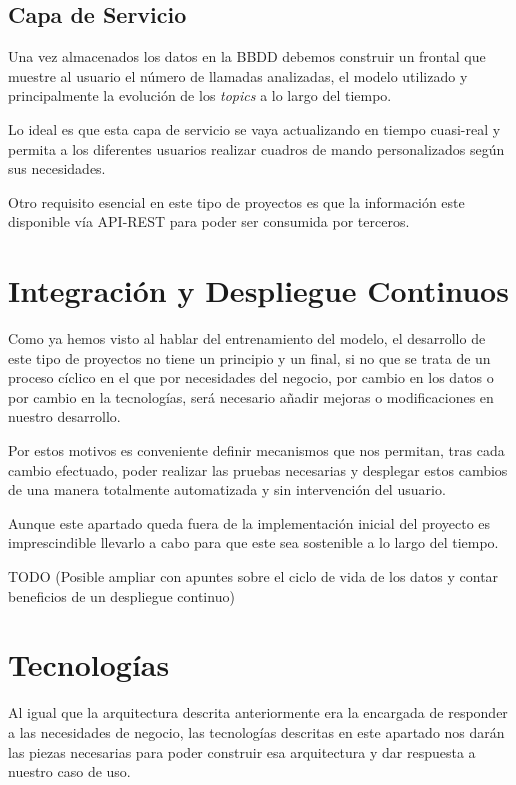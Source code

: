 \subsection{Capa de Servicio}
Una vez almacenados los datos en la BBDD debemos construir un frontal que muestre al usuario el número de llamadas analizadas, el modelo utilizado y principalmente la evolución de los \textit{topics} a lo largo del tiempo. 

Lo ideal es que esta capa de servicio se vaya actualizando en tiempo cuasi-real y permita a los diferentes usuarios realizar cuadros de mando personalizados según sus necesidades. 

Otro requisito esencial en este tipo de proyectos es que la información este disponible vía API-REST para poder ser consumida por terceros.    


\section{Integración y Despliegue Continuos}
Como ya hemos visto al hablar del entrenamiento del modelo, el desarrollo de este tipo de proyectos no tiene un principio y un final, si no que se trata de un proceso cíclico en el que por necesidades del negocio, por cambio en los datos o por cambio en la tecnologías, será necesario añadir mejoras o modificaciones en nuestro desarrollo. 

Por estos motivos es conveniente definir mecanismos que nos permitan, tras cada cambio efectuado, poder realizar las pruebas necesarias y desplegar estos cambios de una manera totalmente automatizada y sin intervención del usuario. 

Aunque este apartado queda fuera de la implementación inicial del proyecto es imprescindible llevarlo a cabo para que este sea sostenible a lo largo del tiempo. 


TODO (Posible ampliar con apuntes sobre el ciclo de vida de los datos y contar beneficios de un despliegue continuo)

\section{Tecnologías}

Al igual que la arquitectura descrita anteriormente era la encargada de responder a las necesidades de negocio, las tecnologías descritas en este apartado nos darán las piezas necesarias para poder construir esa arquitectura y dar respuesta a nuestro caso de uso. 


